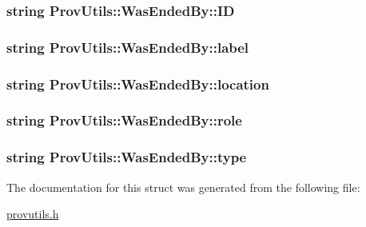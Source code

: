 \hypertarget{struct_prov_utils_1_1_was_ended_by_a09c7891b60eafd8fd5e5fffd567b1a44}{
\subsubsection[{I\-D}]{\setlength{\rightskip}{0pt plus 5cm}string Prov\-Utils\-::\-Was\-Ended\-By\-::\-I\-D}}\label{struct_prov_utils_1_1_was_ended_by_a09c7891b60eafd8fd5e5fffd567b1a44}
\hypertarget{struct_prov_utils_1_1_was_ended_by_af82ae3d026502438a125dd862c70091e}{
\subsubsection[{label}]{\setlength{\rightskip}{0pt plus 5cm}string Prov\-Utils\-::\-Was\-Ended\-By\-::label}}\label{struct_prov_utils_1_1_was_ended_by_af82ae3d026502438a125dd862c70091e}
\hypertarget{struct_prov_utils_1_1_was_ended_by_a9facb5793326c01fb66c0d468f463fe7}{
\subsubsection[{location}]{\setlength{\rightskip}{0pt plus 5cm}string Prov\-Utils\-::\-Was\-Ended\-By\-::location}}\label{struct_prov_utils_1_1_was_ended_by_a9facb5793326c01fb66c0d468f463fe7}
\hypertarget{struct_prov_utils_1_1_was_ended_by_a99d83d6c5ec830f2c1fc45d7aa886742}{
\subsubsection[{role}]{\setlength{\rightskip}{0pt plus 5cm}string Prov\-Utils\-::\-Was\-Ended\-By\-::role}}\label{struct_prov_utils_1_1_was_ended_by_a99d83d6c5ec830f2c1fc45d7aa886742}
\hypertarget{struct_prov_utils_1_1_was_ended_by_a2b57f65acc219202e111c989a5523188}{
\subsubsection[{type}]{\setlength{\rightskip}{0pt plus 5cm}string Prov\-Utils\-::\-Was\-Ended\-By\-::type}}\label{struct_prov_utils_1_1_was_ended_by_a2b57f65acc219202e111c989a5523188}


The documentation for this struct was generated from the following file\-:\begin{DoxyCompactItemize}
\item 
\hyperlink{provutils_8h}{provutils.\-h}\end{DoxyCompactItemize}
